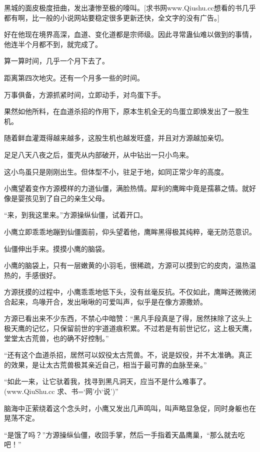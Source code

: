 
\begin{this_body}

黑城的面皮极度扭曲，发出凄惨至极的嚎叫。[求书网www.Qiushu.cc想看的书几乎都有啊，比一般的小说网站要稳定很多更新还快，全文字的没有广告。]

好在他现在境界高深，血道、变化道都是宗师级。因此寻常蛊仙难以做到的事情，他连半个月都不到，就完成了。

算一算时间，几乎一个月下去了。

距离第四次地灾。还有一个月多一些的时间。

万事俱备，方源抓紧时间，立即动手，对鸟蛋下手。

果然如他所料，在血道杀招的作用下，原本生机全无的鸟蛋立即焕发出了一股生机。

随着鲜血灌溉得越来越多，这股生机也越发旺盛，并且对方源越加亲切。

足足八天八夜之后，蛋壳从内部破开，从中钻出一只小鸟来。

这小鸟虽只是刚刚出生。但体型不小，驻足于地，如同正常少年的高度。

小鹰望着变作方源模样的力道仙僵，满脸热情。犀利的鹰眸中竟是孺慕之情。就好像是婴孩见到了自己的亲生父母。

“来，到我这里来。”方源操纵仙僵，试着开口。

小鹰立即乖乖地蹦到仙僵面前，仰头望着他，鹰眸黑得极其纯粹，毫无防范意识。

仙僵伸出手来。摸摸小鹰的脑袋。

小鹰的脑袋上，只有一层嫩黄的小羽毛，很稀疏，方源可以摸到它的皮肉，温热温热的，手感很好。

方源抚摸的过程中，小鹰乖乖地低下头，没有丝毫反抗。不仅如此，鹰眸还微微闭合起来，鸟喙开合，发出啾啾的可爱叫声，似乎是在像方源撒娇。

方源已看出来不少东西，不禁心中暗赞：“黑凡手段真是了得，居然抹除了这头上极天鹰的记忆，只保留前世的宇道道痕积累。不过若是有前世记忆，这上极天鹰，堂堂太古荒兽，也的确不好控制。”

“还有这个血道杀招，居然可以奴役太古荒兽。不，说是奴役，并不太准确。真正的效果，是让太古荒兽极其亲近自己，相当于最可靠的血脉至亲。”

“如此一来，让它驮着我，找寻到黑凡洞天，应当不是什么难事了。(www.QiuShu.cc 求、书=‘网’小‘说’)”

脑海中正萦绕着这个念头时，小鹰又发出几声鸣叫，叫声略显急促，同时身躯也在晃荡不定。

“是饿了吗？”方源操纵仙僵，收回手掌，然后一手指着天晶鹰巢，“那么就去吃吧！”


\end{this_body}
